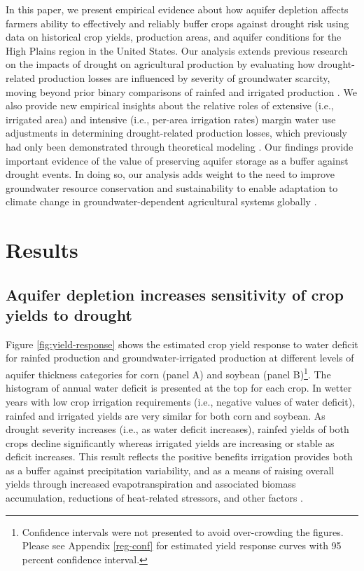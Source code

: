 \documentclass[
]{article}
\begin{document}
In this paper, we present empirical evidence about how aquifer depletion affects farmers ability to effectively and reliably buffer crops against drought risk using data on historical crop yields, production areas, and aquifer conditions for the High Plains region in the United States. Our analysis extends previous research on the impacts of drought on agricultural production by evaluating how drought-related production losses are influenced by severity of groundwater scarcity, moving beyond prior binary comparisons of rainfed and irrigated production \citep{schlenker2009nonlinear, lobell2014greater, lu2018crop}. We also provide new empirical insights about the relative roles of extensive (i.e., irrigated area) and intensive (i.e., per-area irrigation rates) margin water use adjustments in determining drought-related production losses, which previously had only been demonstrated through theoretical modeling \citep{foster2014modeling, foster2017effects, rad2020effects}. Our findings provide important evidence of the value of preserving aquifer storage as a buffer against drought events. In doing so, our analysis adds weight to the need to improve groundwater resource conservation and sustainability to enable adaptation to climate change in groundwater-dependent agricultural systems globally \citep{jain2021groundwater, scanlon2023global}.

\hypertarget{results}{%
\section{Results}\label{results}}

\hypertarget{impact-intensive}{%
\subsection{Aquifer depletion increases sensitivity of crop yields to drought}\label{impact-intensive}}

Figure \ref{fig:yield-response} shows the estimated crop yield response to water deficit for rainfed production and groundwater-irrigated production at different levels of aquifer thickness categories for corn (panel A) and soybean (panel B)\footnote{Confidence intervals were not presented to avoid over-crowding the figures. Please see Appendix \ref{reg-conf} for estimated yield response curves with 95 percent confidence interval.}. The histogram of annual water deficit is presented at the top for each crop. In wetter years with low crop irrigation requirements (i.e., negative values of water deficit), rainfed and irrigated yields are very similar for both corn and soybean. As drought severity increases (i.e., as water deficit increases), rainfed yields of both crops decline significantly whereas irrigated yields are increasing or stable as deficit increases. This result reflects the positive benefits irrigation provides both as a buffer against precipitation variability, and as a means of raising overall yields through increased evapotranspiration and associated biomass accumulation, reductions of heat-related stressors, and other factors \citep{zhu2022untangling, li2020quantifying}.
\end{document}
